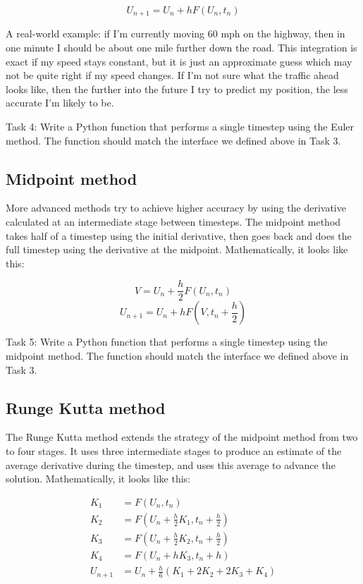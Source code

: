 \documentclass[main.tex]{subfiles}
\begin{document}
\begin{equation}
    U_{n+1} = U_n + h F(U_n, t_n)
\end{equation}

A real-world example: if I'm currently moving 60 mph on the highway, then in one minute I should be about one mile further down the road.
This integration is exact if my speed stays constant, but it is just an approximate guess which may not be quite right if my speed changes.
If I'm not sure what the traffic ahead looks like, then the further into the future I try to predict my position, the less accurate I'm likely to be.

Task 4:
Write a Python function that performs a single timestep using the Euler method.
The function should match the interface we defined above in Task 3.

\subsection{Midpoint method}

More advanced methods try to achieve higher accuracy by using the derivative calculated at an intermediate stage between timesteps.
The midpoint method takes half of a timestep using the initial derivative, then goes back and does the full timestep using the derivative at the midpoint.
Mathematically, it looks like this:

\begin{equation}
    V = U_n + \frac{h}{2} F(U_n, t_n)
\end{equation}
%
\begin{equation}
    U_{n+1} = U_n + h F\left(V, t_n + \frac{h}{2}\right)
\end{equation}

Task 5:
Write a Python function that performs a single timestep using the midpoint method.
The function should match the interface we defined above in Task 3.

\subsection{Runge Kutta method}

The Runge Kutta method extends the strategy of the midpoint method from two to four stages.
It uses three intermediate stages to produce an estimate of the average derivative during the timestep, and uses this average to advance the solution.
Mathematically, it looks like this:

\begin{align}
    K_1 &= F(U_n, t_n) \\
    K_2 &= F(U_n + \frac{h}{2} K_1, t_n + \frac{h}{2}) \\
    K_3 &= F(U_n + \frac{h}{2} K_2, t_n + \frac{h}{2}) \\
    K_4 &= F(U_n + h K_3, t_n + h) \\
    U_{n+1} &= U_n + \frac{h}{6} (K_1 + 2 K_2 + 2 K_3 + K_4) \\
\end{align}
\end{document}

